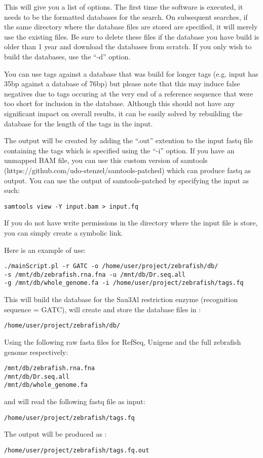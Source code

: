 \documentclass[a4paper,12pt]{article}
\begin{document}
This will give you a list of options. The first time the software is executed, it needs to be the formatted databases for the search. On subsequent searches, if the same directory where the database files are stored are specified, it will merely use the existing files. Be sure to delete these files if the database you have build is older than 1 year and download the databases from scratch. If you only wish to build the databases, use the ``-d'' option. 

You can use tags against a database that was build for longer tags (e.g. input has 35bp against a database of 76bp) but please note that this may induce false negatives due to tags occuring at the very end of a reference sequence that were too short for inclusion in the database. Although this should not have any significant impact on overall results, it can be easily solved by rebuilding the database for the length of the tags in the input.

The output will be created by adding the ``.out'' extention to the input fastq file containing the tags which is specified using the ``-i'' option. If you have an unmapped BAM file, you can use this custom version of samtools (https://github.com/udo-stenzel/samtools-patched) which can produce fastq as output. You can use the output of samtools-patched by specifying the input as such:
\small{
\begin{verbatim}
samtools view -Y input.bam > input.fq
\end{verbatim}
}

If you do not have write permissions in the directory where the input file is store, you can simply create a symbolic link. 

Here is an example of use:

\small{
\begin{verbatim}
./mainScript.pl -r GATC -o /home/user/project/zebrafish/db/ 
-s /mnt/db/zebrafish.rna.fna -u /mnt/db/Dr.seq.all 
-g /mnt/db/whole_genome.fa -i /home/user/project/zebrafish/tags.fq
\end{verbatim}
}

This will build the database for the Sau3Al restriction enzyme (recognition sequence = GATC), will create and store the database files in :
\begin{verbatim}
/home/user/project/zebrafish/db/ 
\end{verbatim}
Using the following raw fasta files for RefSeq, Unigene and the full zebrafish genome respectively:

\begin{verbatim}
/mnt/db/zebrafish.rna.fna
/mnt/db/Dr.seq.all 
/mnt/db/whole_genome.fa
\end{verbatim}
and will read the following fastq file as input:
\begin{verbatim}
/home/user/project/zebrafish/tags.fq
\end{verbatim}
The output will be produced as :
\begin{verbatim}
/home/user/project/zebrafish/tags.fq.out
\end{verbatim}
\end{document}
